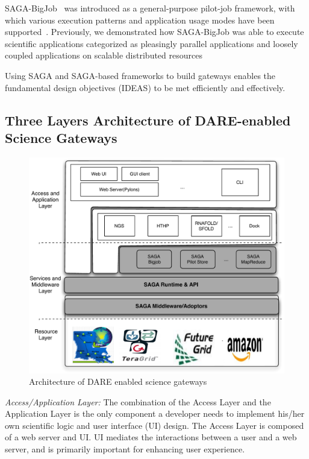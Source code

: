 \documentclass{sig-alternate}
\begin{document}
SAGA-BigJob~\cite{saga-ccgrid10} was introduced as a general-purpose
pilot-job framework, with which various execution patterns and
application usage modes have been
supported~\cite{async_repex11,saga-royalsoc}.  Previously, we
demonstrated how SAGA-BigJob was able to execute scientific
applications categorized as pleasingly parallel applications and
loosely coupled applications on scalable distributed
resources\cite{jha2009developing, ecmls10, ecmls11}

Using SAGA and SAGA-based frameworks to build gateways enables the
fundamental design objectives (IDEAS) to be met efficiently and
effectively.


\subsection{Three Layers Architecture of DARE-enabled Science
  Gateways}

\begin{figure}
  \centering
  \includegraphics[scale=0.40]{figures/DAREOutline.pdf}
\caption{\small Architecture of DARE enabled science gateways }
  \label{fig:dare-arch} 
\end{figure}

\textit{Access/Application Layer:} The combination of the Access Layer
and the Application Layer is the only component a developer needs to
implement his/her own scientific logic and user interface (UI) design.
The Access Layer is composed of a web server and UI.  UI mediates the
interactions between a user and a web server, and is primarily
important for enhancing user experience.
\end{document}
